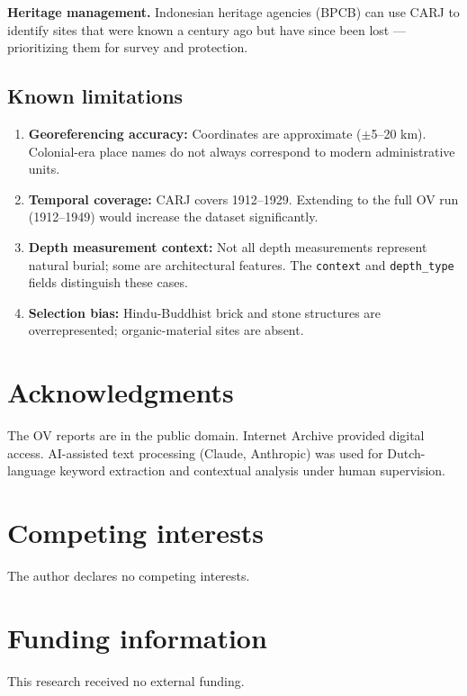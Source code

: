 \documentclass[11pt]{article}
\begin{document}
\textbf{Heritage management.} Indonesian heritage agencies (BPCB) can use CARJ to identify sites that were known a century ago but have since been lost --- prioritizing them for survey and protection.

\subsection{Known limitations}

\begin{enumerate}
    \item \textbf{Georeferencing accuracy:} Coordinates are approximate ($\pm$5--20 km). Colonial-era place names do not always correspond to modern administrative units.
    \item \textbf{Temporal coverage:} CARJ covers 1912--1929. Extending to the full OV run (1912--1949) would increase the dataset significantly.
    \item \textbf{Depth measurement context:} Not all depth measurements represent natural burial; some are architectural features. The \texttt{context} and \texttt{depth\_type} fields distinguish these cases.
    \item \textbf{Selection bias:} Hindu-Buddhist brick and stone structures are overrepresented; organic-material sites are absent.
\end{enumerate}

\section*{Acknowledgments}

The OV reports are in the public domain. Internet Archive provided digital access. AI-assisted text processing (Claude, Anthropic) was used for Dutch-language keyword extraction and contextual analysis under human supervision.

\section*{Competing interests}

The author declares no competing interests.

\section*{Funding information}

This research received no external funding.



\end{document}
